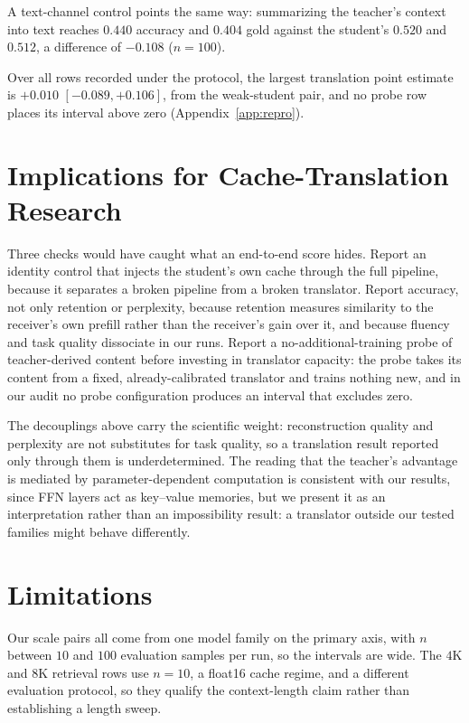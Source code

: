 \documentclass[10pt]{article}
\begin{document}
A text-channel control points the same way: summarizing the teacher's context
into text reaches $0.440$ accuracy and $0.404$ gold against the student's $0.520$
and $0.512$, a difference of $-0.108$ ($n{=}100$).

Over all rows recorded under the protocol, the largest translation point
estimate is $+0.010$ $[-0.089,+0.106]$, from the weak-student pair, and no probe
row places its interval above zero (Appendix~\ref{app:repro}).


\section{Implications for Cache-Translation Research}
\label{sec:implications}

Three checks would have caught what an end-to-end score hides. Report an identity
control that injects the student's own cache through the full pipeline, because
it separates a broken pipeline from a broken translator. Report accuracy, not
only retention or perplexity, because retention measures similarity to the
receiver's own prefill rather than the receiver's gain over it, and because
fluency and task quality dissociate in our runs. Report a no-additional-training probe of teacher-derived
content before investing in translator capacity: the probe takes its content from
a fixed, already-calibrated translator and trains nothing new, and in our audit
no probe configuration produces an interval that excludes zero.

The decouplings above carry the scientific weight: reconstruction quality and
perplexity are not substitutes for task quality, so a translation result
reported only through them is underdetermined. The reading that the teacher's
advantage is mediated by parameter-dependent computation is consistent with our
results, since FFN layers act as key--value memories, but we present it as an
interpretation rather than an impossibility result: a translator outside our
tested families might behave differently.


\section{Limitations}
\label{sec:limitations}

Our scale pairs all come from one model family on the primary axis, with $n$
between $10$ and $100$ evaluation samples per run, so the intervals are wide.
The $4$K and $8$K retrieval rows use
$n{=}10$, a float16 cache regime, and a different evaluation protocol, so they
qualify the context-length claim rather than establishing a length sweep.
\end{document}
